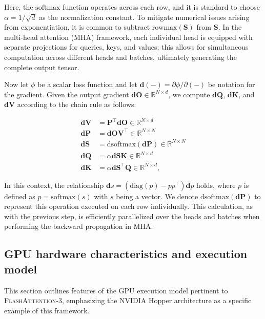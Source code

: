 Here, the $\mathrm{softmax}$ function operates across each row, and it is standard to choose $\alpha = 1/\sqrt{d}$ as the normalization constant. To mitigate numerical issues arising from exponentiation, it is common to subtract $\mathrm{rowmax}(\mathbf{S})$ from $\mathbf{S}$. In the multi-head attention (MHA) framework, each individual head is equipped with separate projections for queries, keys, and values; this allows for simultaneous computation across different heads and batches, ultimately generating the complete output tensor.

Now let $\phi$ be a scalar loss function and let $\mathbf{d}(-) = \partial \phi / \partial (-)$ be notation for the gradient. Given the output gradient $\mathbf{dO} \in \mathbb{R}^{N \times d}$, we compute $\mathbf{dQ}$, $\mathbf{dK}$, and $\mathbf{dV}$ according to the chain rule as follows:

\begin{align*}
  \mathbf{dV} &= \mathbf{P}^\top \mathbf{dO} \in \mathbb{R}^{N \times d} \\
  \mathbf{dP} &= \mathbf{dO} \mathbf{V}^\top \in \mathbb{R}^{N \times N} \\
  \mathbf{dS} &= \mathrm{dsoftmax} (\mathbf{dP}) \in \mathbb{R}^{N \times N} \\
  \mathbf{dQ} &= \alpha \mathbf{dS} \mathbf{K} \in \mathbb{R}^{N \times d} \\
  \mathbf{dK} &= \alpha \mathbf{dS}^\top \mathbf{Q} \in \mathbb{R}^{N \times d},
\end{align*}

In this context, the relationship $\mathbf{d}s = (\mathrm{diag}(p) - p p^\top)\mathbf{d}p$ holds, where $p$ is defined as $p = \mathrm{softmax}(s)$ with $s$ being a vector. We denote $\mathrm{dsoftmax}(\mathbf{dP})$ to represent this operation executed on each row individually. This calculation, as with the previous step, is efficiently parallelized over the heads and batches when performing the backward propagation in MHA.

\subsection{GPU hardware characteristics and execution model}
\label{subsec:hardware}

This section outlines features of the GPU execution model pertinent to \textsc{FlashAttention-3}, emphasizing the NVIDIA Hopper architecture as a specific example of this framework.

